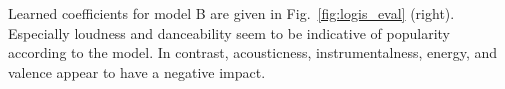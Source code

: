 \documentclass{article}
\begin{document}

Learned coefficients for model B are given in Fig.~\ref{fig:logis_eval} (right). Especially loudness and danceability seem to be indicative of popularity according to the model. In contrast, acousticness, instrumentalness, energy, and valence appear to have a negative impact.
\end{document}
